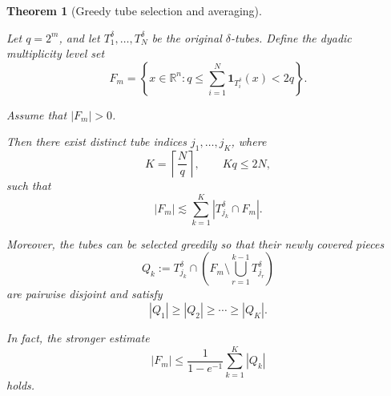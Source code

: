 \documentclass[11pt, letterpaper]{nyjm}
\newtheorem{theorem}{Theorem}[section]
\begin{document}
\begin{theorem}[Greedy tube selection and averaging]
	\label{thm:greedy-selection}
	
	Let $q=2^m$, and let
	$T_1^\delta,\ldots,T_N^\delta$ be the original
	$\delta$-tubes. Define the dyadic multiplicity
	level set
	\[
	F_m=
	\left\{
	x\in\mathbb R^n:
	q\leq\sum_{i=1}^N
	\mathbf{1}_{T_i^\delta}(x)<2q
	\right\}.
	\]
	
	Assume that $|F_m|>0$.
	
	Then there exist distinct tube indices
	$j_1,\ldots,j_K$, where
	\[
	K=\left\lceil\frac Nq\right\rceil,
	\qquad Kq\leq 2N,
	\]
	such that
	\[
	\boxed{
		|F_m|\lesssim
		\sum_{k=1}^K
		|T_{j_k}^\delta\cap F_m|.
	}
	\]
	
	Moreover, the tubes can be selected greedily
	so that their newly covered pieces
	\[
	Q_k:=
	T_{j_k}^\delta\cap
	\left(
	F_m\setminus
	\bigcup_{r=1}^{k-1}T_{j_r}^\delta
	\right)
	\]
	are pairwise disjoint and satisfy
	\[
	|Q_1|\geq |Q_2|\geq\cdots\geq |Q_K|.
	\]
	
	In fact, the stronger estimate
	\[
	\boxed{
		|F_m|\leq
		\frac{1}{1-e^{-1}}
		\sum_{k=1}^K|Q_k|
	}
	\]
	holds.
	
\end{theorem}
\end{document}
